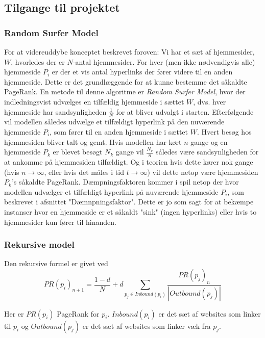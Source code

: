 \subsection*{Tilgange til projektet}

\subsubsection*{Random Surfer Model}


For at videreuddybe konceptet beskrevet foroven: Vi har et sæt af hjemmesider, $W$, hvorledes der er $N$-antal hjemmesider. For hver (men ikke nødvendigvis alle) hjemmeside $P_i$ er der et vis antal hyperlinks der fører videre til en anden hjemmeside. Dette er det grundlæggende for at kunne bestemme det såkaldte PageRank. En metode til denne algoritme er \emph{Random Surfer Model}, hvor der indledningsvist udvælges en tilfældig hjemmeside i sættet $W$, dvs. hver hjemmeside har sandsynligheden $\frac{1}{N}$ for at bliver udvalgt i starten. Efterfølgende vil modellen således udvælge et tilfældigt hyperlink på den nuværende hjemmeside $P_i$, som fører til en anden hjemmeside i sættet $W$. Hvert besøg hos hjemmesiden bliver talt og gemt. Hvis modellen har kørt $n$-gange og en hjemmeside $P_k$ er blevet besøgt $N_k$ gange vil $\frac{N_k}{n}$ således være sandsynligheden for at ankomme på hjemmesiden tilfældigt. Og i teorien hvis dette kører nok gange (hvis $n \rightarrow \infty$, eller hvis det måles i tid $t \rightarrow \infty$) vil dette netop være hjemmesiden $P_k$'s såkaldte PageRank. Dæmpningsfaktoren kommer i spil netop der hvor modellen udvælger et tilfældigt hyperlink på nuværende hjemmeside $P_i$, som beskrevet i afsnittet "Dæmnpningsfaktor". Dette er jo som sagt for at bekæmpe instanser hvor en hjemmeside er et såkaldt "sink" (ingen hyperlinks) eller hvis to hjemmesider kun fører til hinanden.


\subsubsection*{Rekursive model}

Den rekursive formel er givet ved
\begin{equation} \label{udgangspunkt}
    PR(p_i)_{n+1}=\frac{1-d}N+d\sum_{p_j\in Inbound(p_i)}\frac{PR(p_j)_n}{\left|Outbound(p_j)\right|}
\end{equation}

Her er $PR(p_i)$ PageRank for $p_i$. $Inbound(p_i)$ er det sæt af websites som linker til $p_i$ og $Outbound(p_j)$ er det sæt af websites som linker væk fra $p_j$.

